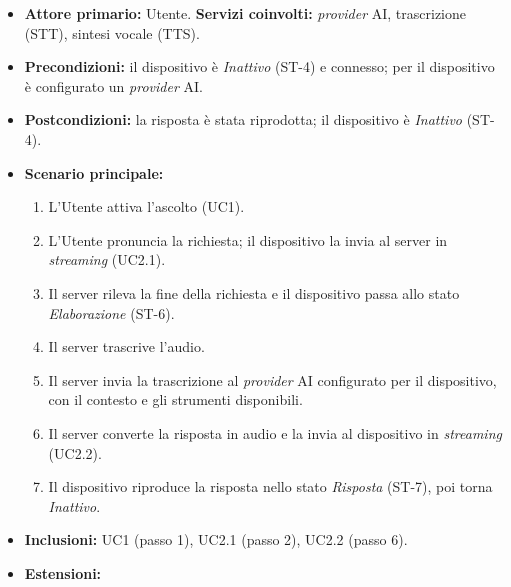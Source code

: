\documentclass[12pt,a4paper]{article}
\newcommand{\tightlist}{\setlength{\itemsep}{1pt}\setlength{\parskip}{0pt}}
\begin{document}
\begin{itemize}

\tightlist

\item \textbf{Attore primario:} Utente. \textbf{Servizi coinvolti:} \emph{provider} AI, trascrizione (STT), sintesi vocale (TTS).

\item \textbf{Precondizioni:} il dispositivo è \emph{Inattivo} (ST-4) e connesso; per il dispositivo è configurato un \emph{provider} AI.

\item \textbf{Postcondizioni:} la risposta è stata riprodotta; il dispositivo è \emph{Inattivo} (ST-4).

\item \textbf{Scenario principale:}

\begin{enumerate}

\tightlist

\item L'Utente attiva l'ascolto (UC1).

\item L'Utente pronuncia la richiesta; il dispositivo la invia al server in \emph{streaming} (UC2.1).

\item Il server rileva la fine della richiesta e il dispositivo passa allo stato \emph{Elaborazione} (ST-6).

\item Il server trascrive l'audio.

\item Il server invia la trascrizione al \emph{provider} AI configurato per il dispositivo, con il contesto e gli strumenti disponibili.

\item Il server converte la risposta in audio e la invia al dispositivo in \emph{streaming} (UC2.2).

\item Il dispositivo riproduce la risposta nello stato \emph{Risposta} (ST-7), poi torna \emph{Inattivo}.

\end{enumerate}

\item \textbf{Inclusioni:} UC1 (passo 1), UC2.1 (passo 2), UC2.2 (passo 6).

\item \textbf{Estensioni:}

\begin{itemize}


\end{itemize}
\end{itemize}
\end{document}
